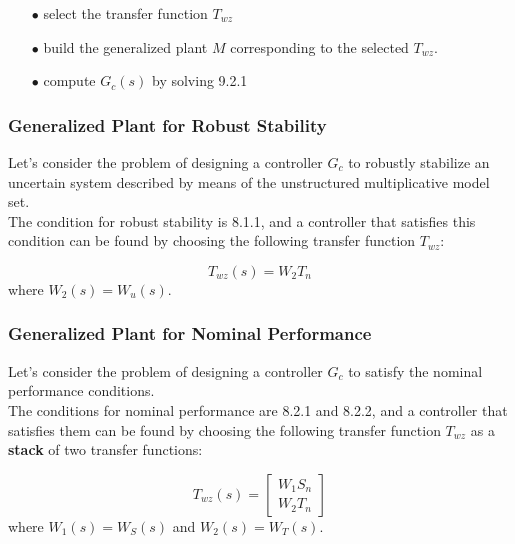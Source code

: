\documentclass[a4paper,10pt,titlepage]{article}
\numberwithin{equation}{subsection}
\begin{document}
	\begin{enumerate}
		\item[$\bullet$] select the transfer function $T_{wz}$
		\item[$\bullet$] build the generalized plant $M$ corresponding to the selected $T_{wz}$.
		\item[$\bullet$] compute $G_c(s)$ by solving 9.2.1
	\end{enumerate}
	
	\subsubsection{Generalized Plant for Robust Stability}
	Let's consider the problem of designing a controller $G_c$ to robustly stabilize an uncertain system described by means of the unstructured multiplicative model set.\\
	The condition for robust stability is 8.1.1, and a controller that satisfies this condition can be found by choosing the following transfer function $T_{wz}$:
	
	\begin{equation}
		T_{wz}(s) = W_2T_n
	\end{equation}
	where $W_2(s) = W_u(s)$.
	
	\subsubsection{Generalized Plant for Nominal Performance}
	Let's consider the problem of designing a controller $G_c$ to satisfy the nominal performance conditions.\\
	The conditions for nominal performance are 8.2.1 and 8.2.2, and a controller that satisfies them can be found by choosing the following transfer function $T_{wz}$ as a \textbf{stack} of two transfer functions:
	
	\begin{equation}
		T_{wz}(s) = 
		\begin{bmatrix}
			W_1 S_n \\
			W_2 T_n
		\end{bmatrix}
	\end{equation}
	where $W_1(s) = W_S(s)$ and $W_2(s) = W_T(s)$.
	
\end{document}

